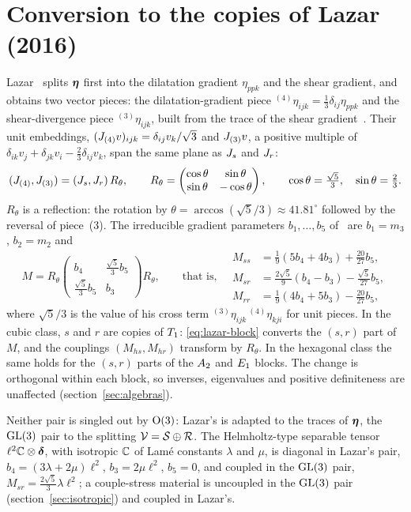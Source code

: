 \section{Conversion to the copies of Lazar (2016)}\label{app:lazar}

Lazar~\cite{Lazar2016} splits $\bm{\eta}$ first into the dilatation gradient $\eta_{ppk}$ and
the shear gradient, and obtains two vector pieces: the dilatation-gradient piece
${}^{(4)}\eta_{ijk}=\tfrac13\delta_{ij}\eta_{ppk}$ and the shear-divergence piece
${}^{(3)}\eta_{ijk}$, built from the trace of the shear gradient~\cite[eqs.~(53)--(54)]{Lazar2016}.
Their unit embeddings, $(J_{(4)}v)_{ijk}=\delta_{ij}v_k/\sqrt3$ and $J_{(3)}v$, a
positive multiple of $\delta_{ik}v_j+\delta_{jk}v_i-\tfrac23\delta_{ij}v_k$, span the same
plane as $J_{s}$ and $J_{r}$:
\begin{equation}
(J_{(4)},J_{(3)})=(J_{s},J_{r})\,R_\theta,\qquad
R_\theta=\begin{pmatrix}\cos\theta&\sin\theta\\ \sin\theta&-\cos\theta\end{pmatrix},\qquad
\cos\theta=\tfrac{\sqrt5}{3},\quad \sin\theta=\tfrac23.\label{eq:lazar-pair}
\end{equation}
$R_\theta$ is a reflection: the rotation by $\theta=\arccos(\sqrt5/3)\approx41.81^\circ$
followed by the reversal of piece~(3). The irreducible gradient parameters $b_1,\dots,b_5$
of~\cite[eq.~(60)]{Lazar2016} are $b_1=m_3$, $b_2=m_2$ and
\begin{equation}
M=R_\theta\begin{pmatrix}b_4&\tfrac{\sqrt5}{3}b_5\\ \tfrac{\sqrt5}{3}b_5&b_3\end{pmatrix}R_\theta,
\qquad\text{that is,}\quad
\begin{aligned}
M_{ss}&=\tfrac19(5b_4+4b_3)+\tfrac{20}{27}b_5,\\
M_{sr}&=\tfrac{2\sqrt5}{9}(b_4-b_3)-\tfrac{\sqrt5}{27}b_5,\\
M_{rr}&=\tfrac19(4b_4+5b_3)-\tfrac{20}{27}b_5,
\end{aligned}\label{eq:lazar-block}
\end{equation}
where $\sqrt5/3$ is the value of his cross term
${}^{(3)}\eta_{ijk}\,{}^{(4)}\eta_{kji}$ for unit pieces. In the cubic class, $s$ and $r$
are copies of $T_1$: \eqref{eq:lazar-block} converts the $(s,r)$ part of $M$, and
the couplings $(M_{hs},M_{hr})$ transform by $R_\theta$. In the hexagonal class the same
holds for the $(s,r)$ parts of the $A_2$ and $E_1$ blocks. The change is
orthogonal within each block, so inverses, eigenvalues and positive definiteness are
unaffected (section~\ref{sec:algebras}).

Neither pair is singled out by $\mathrm{O}(3)$: Lazar's is adapted to the traces of $\bm{\eta}$, the
$\mathrm{GL}(3)$ pair to the splitting $\mathcal{V}=\mathcal S\oplus\mathcal R$. The Helmholtz-type separable
tensor $\ell^2\mathbb{C}\otimes\bm{\delta}$, with isotropic $\mathbb{C}$ of Lamé constants $\lambda$ and $\mu$, is
diagonal in Lazar's pair, $b_4=(3\lambda+2\mu)\ell^2$, $b_3=2\mu\ell^2$, $b_5=0$, and
coupled in the $\mathrm{GL}(3)$ pair, $M_{sr}=\tfrac{2\sqrt5}{3}\lambda\ell^2$; a couple-stress
material is uncoupled in the $\mathrm{GL}(3)$ pair (section~\ref{sec:isotropic}) and coupled in
Lazar's.
